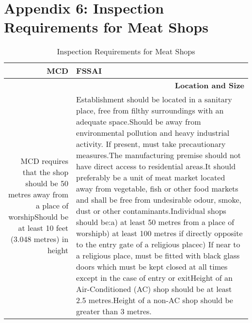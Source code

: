 \documentclass[a4paper, 12pt]{article}
\begin{document}
\section*{Appendix 6: Inspection Requirements for Meat Shops}
\begin{longtable}{rp{21.57em}}
\caption{Inspection Requirements for Meat Shops} \\
\midrule
\endfirsthead
\endhead
    \multicolumn{1}{p{11.93em}}{\textbf{MCD}} & \textbf{FSSAI} \\
    \midrule
    \multicolumn{2}{p{33.5em}}{\textbf{Location and Size}} \\
    \midrule
    \multicolumn{1}{p{11.93em}}{MCD requires that the shop should be 50 metres away from a place of worship\newline{}\newline{}Should be at least 10 feet (3.048 metres) in height} & Establishment should be located in a sanitary place, free from filthy surroundings with an adequate space.\newline{}\newline{}Should be away from environmental pollution and heavy industrial activity. If present, must take precautionary measures.\newline{}\newline{}The manufacturing premise should not have direct access to residential areas.\newline{}It should preferably be a unit of meat market located away from vegetable, fish or other food markets and shall be free from undesirable odour, smoke, dust or other contaminants.\newline{}\newline{}Individual shops should be:\newline{}a) at least 50 metres from a place of worship\newline{}b) at least 100 metres if directly opposite to the entry gate of a religious place\newline{}c) If near to a religious place, must be fitted with black glass doors which must be kept closed at all times except in the case of entry or exit\newline{}\newline{}Height of an Air-Conditioned (AC) shop should be at least 2.5 metres.\newline{}Height of a non-AC shop should be greater than 3 metres. \newline{}\newline{}\\

\end{longtable}
\end{document}
